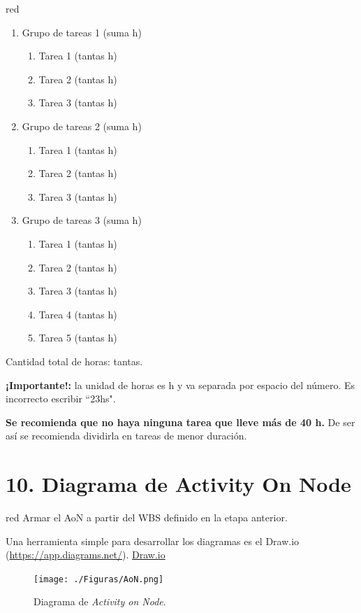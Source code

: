 \documentclass[
11pt, %
]{charter}
\begin{document}
{\begin{consigna}{red}
\begin{enumerate}
\item Grupo de tareas 1 (suma h)
	\begin{enumerate}
	\item Tarea 1 (tantas h)
	\item Tarea 2 (tantas h)
	\item Tarea 3 (tantas h)
	\end{enumerate}
\item Grupo de tareas 2 (suma h)
	\begin{enumerate}
	\item Tarea 1 (tantas h)
	\item Tarea 2 (tantas h)
	\item Tarea 3 (tantas h)
	\end{enumerate}
\item Grupo de tareas 3 (suma h)
	\begin{enumerate}
	\item Tarea 1 (tantas h)
	\item Tarea 2 (tantas h)
	\item Tarea 3 (tantas h)
	\item Tarea 4 (tantas h)
	\item Tarea 5 (tantas h)
	\end{enumerate}
\end{enumerate}

Cantidad total de horas: tantas.

\textbf{¡Importante!:} la unidad de horas es h y va separada por espacio del número. Es incorrecto escribir ``23hs".

\textbf{Se recomienda que no haya ninguna tarea que lleve más de 40 h.} De ser así se recomienda dividirla en tareas de menor duración.

\end{consigna}

\section{10. Diagrama de Activity On Node}
\label{sec:AoN}

\begin{consigna}{red}
Armar el AoN a partir del WBS definido en la etapa anterior.

Una herramienta simple para desarrollar los diagramas es el Draw.io (\url{https://app.diagrams.net/}).
\href{https://app.diagrams.net}{Draw.io}


\begin{figure}[htpb]
\centering 
\texttt{[image: ./Figuras/AoN.png]}
\caption{Diagrama de \textit{Activity on Node}.}
\label{fig:AoN}
\end{figure}


\end{consigna}}
\end{document}
